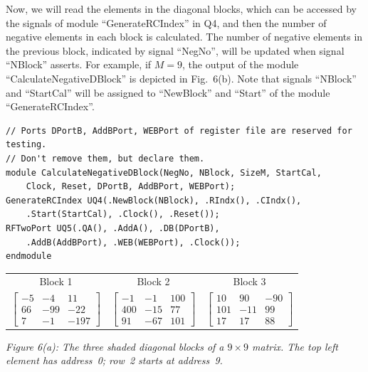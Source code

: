 \documentclass[11pt,a4paper]{article}
\begin{document}
Now, we will read the elements in the diagonal blocks, which can be accessed by the signals of module ``GenerateRCIndex'' in Q4, and then the number of negative elements in each block is calculated. The number of negative elements in the previous block, indicated by signal ``NegNo'', will be updated when signal ``NBlock'' asserts. For example, if $M=9$, the output of the module ``CalculateNegativeDBlock'' is depicted in Fig.~6(b). Note that signals ``NBlock'' and ``StartCal'' will be assigned to ``NewBlock'' and ``Start'' of the module ``GenerateRCIndex''.
\par\medskip\noindent\begin{minipage}{\linewidth}
\begin{lstlisting}
// Ports DPortB, AddBPort, WEBPort of register file are reserved for testing.
// Don't remove them, but declare them.
module CalculateNegativeDBlock(NegNo, NBlock, SizeM, StartCal,
    Clock, Reset, DPortB, AddBPort, WEBPort);
GenerateRCIndex UQ4(.NewBlock(NBlock), .RIndx(), .CIndx(),
    .Start(StartCal), .Clock(), .Reset());
RFTwoPort UQ5(.QA(), .AddA(), .DB(DPortB),
    .AddB(AddBPort), .WEB(WEBPort), .Clock());
endmodule
\end{lstlisting}
\end{minipage}\par
\begin{center}
\begin{tabular}{c@{\qquad}c@{\qquad}c}
Block 1 & Block 2 & Block 3\\[3pt]
$\begin{bmatrix}-5&-4&11\\66&-99&-22\\7&-1&-197\end{bmatrix}$ &
$\begin{bmatrix}-1&-1&100\\400&-15&77\\91&-67&101\end{bmatrix}$ &
$\begin{bmatrix}10&90&-90\\101&-11&99\\17&17&88\end{bmatrix}$
\end{tabular}
\end{center}
\textit{Figure 6(a): The three shaded diagonal blocks of a $9\times9$ matrix. The top left element has address~0; row~2 starts at address~9.}
\end{document}
